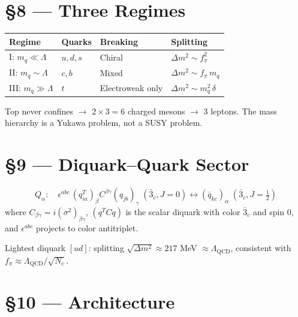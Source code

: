 \documentclass[11pt,a4paper]{article}
\newcommand{\Lqcd}{\Lambda_{\text{QCD}}}
\newcommand{\fpi}{f_\pi}
\newcommand{\Nc}{N_c}
\begin{document}
\section*{\S 8 --- Three Regimes}

\begin{center}
\begin{tabular}{llll}
\toprule
Regime & Quarks & Breaking & Splitting \\
\midrule
I: $m_q \ll \Lambda$ & $u, d, s$ & Chiral & $\Delta m^2 \sim \fpi^2$ \\
II: $m_q \sim \Lambda$ & $c, b$ & Mixed & $\Delta m^2 \sim \fpi\,m_q$ \\
III: $m_q \gg \Lambda$ & $t$ & Electroweak only & $\Delta m^2 \sim m_q^2\,\delta$ \\
\bottomrule
\end{tabular}
\end{center}
Top never confines $\to$ $2 \times 3 = 6$ charged mesons $\to$ 3 leptons.  The mass hierarchy is a Yukawa problem, not a SUSY problem.

\section*{\S 9 --- Diquark--Quark Sector}

\begin{equation}
Q_\alpha:\quad \epsilon^{abc}\,(q_{ia}^T)_\beta C^{\beta\gamma} (q_{jb})_\gamma\;(\bar{3}_c, J{=}0) \longleftrightarrow (\bar{q}_{kc})_{\dot{\alpha}}\;(\bar{3}_c, J{=}\tfrac{1}{2})
\end{equation}
where $C_{\beta\gamma} = i(\sigma^2)_{\beta\gamma}$, $(q^T C q)$ is the scalar diquark with color $\bar{3}_c$ and spin $0$, and $\epsilon^{abc}$ projects to color antitriplet.

Lightest diquark $[ud]$: splitting $\sqrt{\Delta m^2} \approx 217$ MeV $\approx \Lqcd$, consistent with $\fpi \approx \Lqcd/\sqrt{\Nc}$.

\section*{\S 10 --- Architecture}
\end{document}
